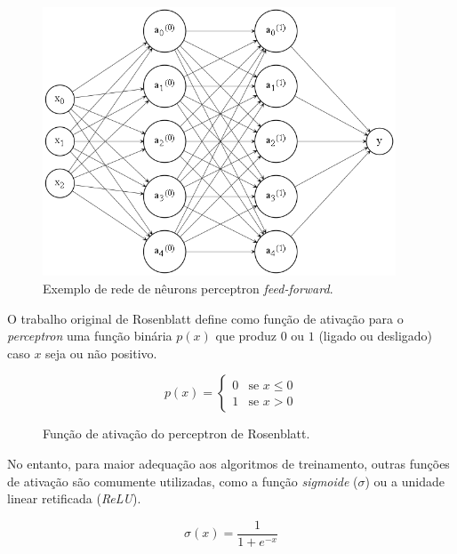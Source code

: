 \documentclass[12pt, a4paper]{article}
\begin{document}
\begin{figure}[H]
	\centering
	\includegraphics[width=\textwidth, height=8cm, keepaspectratio=true]{fig/perceptron_net}
	\caption{Exemplo de rede de nêurons perceptron \emph{feed-forward}.}
\end{figure}

O trabalho original de Rosenblatt define como função de ativação para o \emph{perceptron} uma função binária $p(x)$ que produz $0$ ou $1$ (ligado ou desligado) caso $x$ seja ou não positivo.

\begin{equation}
p(x) =
	\begin{cases}
		0 & \text{se } x \leq 0 \\
		1 & \text{se } x > 0
	\end{cases}
\end{equation}

\begin{figure}[H]
	\centering
	\caption{Função de ativação do perceptron de Rosenblatt.}
\end{figure}

No entanto, para maior adequação aos algoritmos de treinamento, outras funções de ativação são comumente utilizadas, como a função \emph{sigmoide} ($\sigma$) ou a unidade linear retificada (\emph{ReLU}).

\begin{equation}
\sigma(x) = \frac{1}{1 + e^{-x}}
\end{equation}
\end{document}
